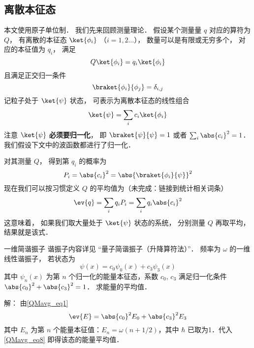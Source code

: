 
\begin{issues}
\issueTODO 
\end{issues}


\subsection{离散本征态}

本文使用原子单位制． 我们先来回顾测量理论． 假设某个测量量 $q$ 对应的算符为 $Q$， 有离散的本征态 $\ket{\phi_i}$ （$i = 1,2\dots$）， 数量可以是有限或无穷多个， 对应的本征值为 $q_i$， 满足
\begin{equation}\label{QMavg_eq3}
Q\ket{\phi_i} = q_i \ket{\phi_i}
\end{equation}
且满足正交归一条件
\begin{equation}\label{QMavg_eq4}
\braket{\phi_i}{\phi_j} = \delta_{i,j}
\end{equation}
记粒子处于 $\ket{\psi}$ 状态， 可表示为离散本征态的线性组合
\begin{equation}\label{QMavg_eq2}
\ket{\psi} = \sum_i c_i \ket{\phi_i}
\end{equation}
注意 $\ket{\psi}$ \textbf{必须要归一化}， 即 $\braket{\psi}{\psi} = 1$ 或者 $\sum_i \abs{c_i}^2 = 1$． 我们假设下文中的波函数都进行了归一化．

对其测量 $Q$， 得到第 $q_i$ 的概率为
\begin{equation}
P_i = \abs{c_i}^2 = \abs{\braket{\phi_i}{\psi}}^2
\end{equation}
现在我们可以按习惯定义 $Q$ 的平均值为（未完成：链接到统计相关词条）
\begin{equation}\label{QMavg_eq1}
\ev{q} = \sum_i q_i P_i = \sum_i q_i \abs{c_i}^2
\end{equation}
这意味着， 如果我们取大量处于 $\ket{\psi}$ 状态的系统， 分别测量 $Q$ 再取平均， 结果就是该式．

\begin{example}{一维简谐振子}
谐振子内容详见 “量子简谐振子（升降算符法）”． 频率为 $\omega$ 的一维线性谐振子， 若状态为
\begin{equation}
\psi(x)=c_0 \psi_0(x)+c_3\psi_3(x)
\end{equation}
其中 $\psi_n(x)$ 为第 $n$ 个归一化的能量本征态，系数 $c_0$, $c_3$ 满足归一化条件 $\abs{c_0}^2+\abs{c_3}^2 = 1$． 求能量的平均值．

解： 由\autoref{QMavg_eq1}
\begin{equation}\label{QMavg_eq8}
\ev{E}=\abs{c_0}^2 E_0+\abs{c_3}^2 E_3
\end{equation}
其中 $E_n$ 为第 $n$ 个能量本征值：$E_n=\omega(n+1/2)$，其中 $\hbar$ 已取为1．代入\autoref{QMavg_eq8} 即得该态的能量平均值．
\end{example}

